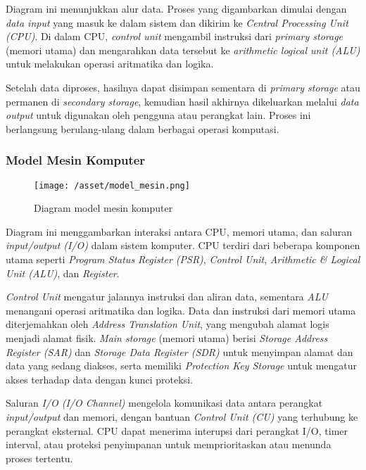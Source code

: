 \documentclass[12pt]{article}
\begin{document}
Diagram ini menunjukkan alur data. Proses yang digambarkan dimulai dengan \textit{data input} yang masuk ke dalam sistem dan dikirim ke \textit{Central Processing Unit (CPU)}. Di dalam CPU, \textit{control unit} mengambil instruksi dari \textit{primary storage} (memori utama) dan mengarahkan data tersebut ke \textit{arithmetic logical unit (ALU)} untuk melakukan operasi aritmatika dan logika.\vspace{10pt}

Setelah data diproses, hasilnya dapat disimpan sementara di \textit{primary storage} atau permanen di \textit{secondary storage}, kemudian hasil akhirnya dikeluarkan melalui \textit{data output} untuk digunakan oleh pengguna atau perangkat lain. Proses ini berlangsung berulang-ulang dalam berbagai operasi komputasi.

\subsubsection{Model Mesin Komputer}

\begin{figure}[h]
    \centering
    \texttt{[image: /asset/model\_mesin.png]}
    \caption{Diagram model mesin komputer}
\end{figure}

Diagram ini menggambarkan interaksi antara CPU, memori utama, dan saluran \textit{input/output (I/O)} dalam sistem komputer. CPU terdiri dari beberapa komponen utama seperti \textit{Program Status Register (PSR)}, \textit{Control Unit}, \textit{Arithmetic & Logical Unit (ALU)}, dan \textit{Register}.\vspace{10pt}

\textit{Control Unit} mengatur jalannya instruksi dan aliran data, sementara \textit{ALU} menangani operasi aritmatika dan logika. Data dan instruksi dari memori utama diterjemahkan oleh \textit{Address Translation Unit}, yang mengubah alamat logis menjadi alamat fisik. \textit{Main storage} (memori utama) berisi \textit{Storage Address Register (SAR)} dan \textit{Storage Data Register (SDR)} untuk menyimpan alamat dan data yang sedang diakses, serta memiliki \textit{Protection Key Storage} untuk mengatur akses terhadap data dengan kunci proteksi.\vspace{10pt}

Saluran \textit{I/O (I/O Channel)} mengelola komunikasi data antara perangkat \textit{input/output} dan memori, dengan bantuan \textit{Control Unit (CU)} yang terhubung ke perangkat eksternal. CPU dapat menerima interupsi dari perangkat I/O, timer interval, atau proteksi penyimpanan untuk memprioritaskan atau menunda proses tertentu.
\end{document}
